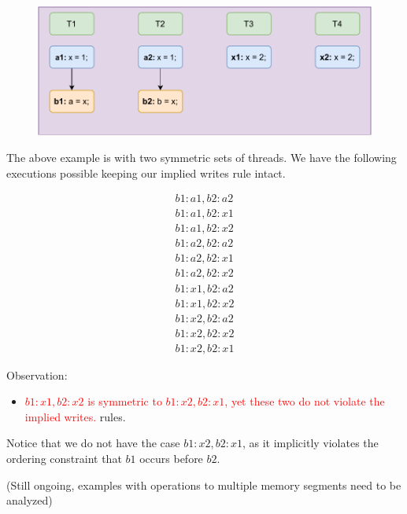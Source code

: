         \begin{figure}
            \centering
            \includegraphics[scale=0.7]{Example6(2+wr+2+w).pdf}
        \end{figure}

       
        The above example is with two symmetric sets of threads. We have the following executions possible keeping our implied writes rule intact. 

        \begin{align*}
            b1:a1 , b2:a2 \\
            b1:a1 , b2:x1 \\
            b1:a1 , b2:x2 \\
            b1:a2 , b2:a2 \\
            b1:a2 , b2:x1 \\
            b1:a2 , b2:x2 \\
            b1:x1 , b2:a2 \\
            b1:x1 , b2:x2 \\ 
            b1:x2 , b2:a2 \\
            b1:x2 , b2:x2 \\
            b1:x2 , b2:x1
        \end{align*}

        Observation:
        \begin{itemize}
            \item \textcolor{red}{$b1:x1 , b2:x2$ is symmetric to $b1:x2 , b2:x1$, yet these two do not violate the implied writes.} rules. 
        \end{itemize}
        
        Notice that we do not have the case $b1:x2 , b2:x1$, as it implicitly violates the ordering constraint that $b1$ occurs before $b2$.

        (Still ongoing, examples with operations to multiple memory segments need to be analyzed)


